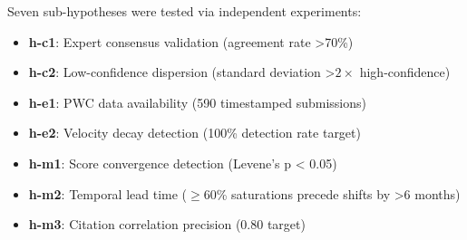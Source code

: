 
Seven sub-hypotheses were tested via independent experiments:

\begin{itemize}
\item \textbf{h-c1}: Expert consensus validation (agreement rate >70\%)
\item \textbf{h-c2}: Low-confidence dispersion (standard deviation >$2\times$ high-confidence)
\item \textbf{h-e1}: PWC data availability (590 timestamped submissions)
\item \textbf{h-e2}: Velocity decay detection (100\% detection rate target)
\item \textbf{h-m1}: Score convergence detection (Levene's p < 0.05)
\item \textbf{h-m2}: Temporal lead time ($\geq 60$\% saturations precede shifts by >6 months)
\item \textbf{h-m3}: Citation correlation precision (0.80 target)
\end{itemize}
